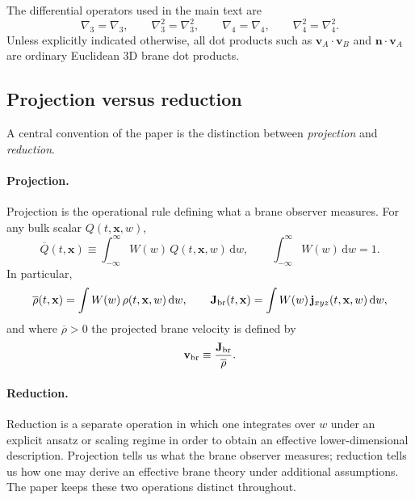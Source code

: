 \documentclass[11pt]{article}
\newcommand{\dd}{\mathrm d}
\newcommand{\x}{\mathbf x}
\newcommand{\vct}{\mathbf v}
\newcommand{\nvec}{\mathbf n}
\newcommand{\gradThree}{\nabla_3}
\newcommand{\gradFour}{\nabla_4}
\newcommand{\lapThree}{\nabla_3^2}
\newcommand{\lapFour}{\nabla_4^2}
\newcommand{\Wproj}{W}
\newcommand{\Proj}[1]{\overline{#1}}
\begin{document}
The differential operators used in the main text are
\begin{equation}
\gradThree=\nabla_3,
\qquad
\lapThree=\nabla_3^2,
\qquad
\gradFour=\nabla_4,
\qquad
\lapFour=\nabla_4^2.
\label{eq:notation-gradients}
\end{equation}
Unless explicitly indicated otherwise, all dot products such as
\(\vct_A\!\cdot\!\vct_B\) and \(\nvec\!\cdot\!\vct_A\) are ordinary Euclidean 3D brane
dot products.

\subsection{Projection versus reduction}
\label{app:notation-projection}

A central convention of the paper is the distinction between \emph{projection} and
\emph{reduction}.

\paragraph{Projection.}
Projection is the operational rule defining what a brane observer measures. For any bulk
scalar \(Q(t,\x,w)\),
\begin{equation}
\Proj{Q}(t,\x)
\equiv
\int_{-\infty}^{\infty}\Wproj(w)\,Q(t,\x,w)\,\dd w,
\qquad
\int_{-\infty}^{\infty}\Wproj(w)\,\dd w=1.
\label{eq:notation-projection}
\end{equation}
In particular,
\begin{equation}
\Proj{\rho}(t,\x)
=
\int \Wproj(w)\,\rho(t,\x,w)\,\dd w,
\qquad
\mathbf J_{\rm br}(t,\x)
=
\int \Wproj(w)\,\mathbf j_{xyz}(t,\x,w)\,\dd w,
\label{eq:notation-projected-density-current}
\end{equation}
and where \(\Proj{\rho}>0\) the projected brane velocity is defined by
\begin{equation}
\mathbf v_{\rm br}
\equiv
\frac{\mathbf J_{\rm br}}{\Proj{\rho}}.
\label{eq:notation-vbrane}
\end{equation}

\paragraph{Reduction.}
Reduction is a separate operation in which one integrates over \(w\) under an explicit
ansatz or scaling regime in order to obtain an effective lower-dimensional description.
Projection tells us what the brane observer measures; reduction tells us how one may
derive an effective brane theory under additional assumptions. The paper keeps these two
operations distinct throughout.
\end{document}
